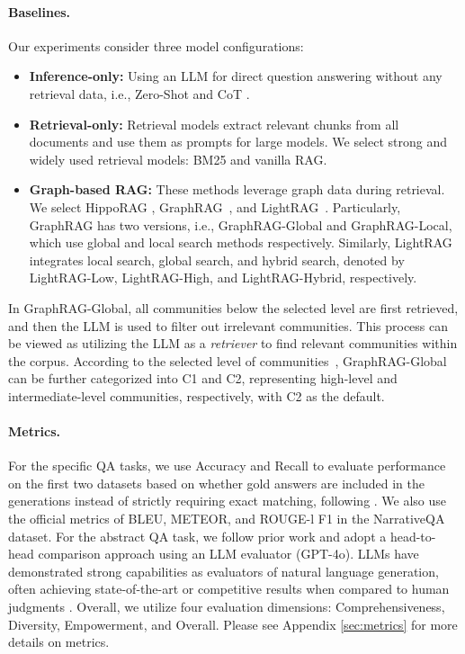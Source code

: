 \paragraph{Baselines.}
Our experiments consider three model configurations:
\begin{itemize}[left=0pt]
\item \textbf{Inference-only:} Using an LLM for direct question answering without any retrieval data, i.e., {Zero-Shot} and {CoT} \cite{kojima2022large}.

\item \textbf{Retrieval-only:} Retrieval models extract relevant chunks from all documents and use them as prompts for large models. We select strong and widely used retrieval models: {BM25} \cite{robertson1994some} and {vanilla RAG}.

\item \textbf{Graph-based RAG:} These methods leverage graph data during retrieval. We select {HippoRAG} \cite{gutierrez2024hipporag}, {GraphRAG}~\cite{edge2024local}, and {LightRAG}~\cite{guo2024lightrag}.
Particularly, {GraphRAG} has two versions, i.e., {GraphRAG-Global} and {GraphRAG-Local}, which use global and local search methods respectively.
Similarly, {LightRAG} integrates local search, global search, and hybrid search, denoted by {LightRAG-Low}, {LightRAG-High}, and {LightRAG-Hybrid}, respectively.
\end{itemize}

In {GraphRAG-Global}, all communities below the selected level are first retrieved, and then the LLM is used to filter out irrelevant communities.
% 
This process can be viewed as utilizing the LLM as a {\it retriever} to find relevant communities within the corpus.
% 
According to the selected level of communities~\cite{edge2024local}, {GraphRAG-Global} can be further categorized into {C1} and {C2}, representing high-level and intermediate-level communities, respectively, with {C2} as the default.
% 

\paragraph{Metrics.}
For the specific QA tasks, we use Accuracy and Recall to evaluate performance on the first two datasets based on whether gold answers are included in the generations instead of strictly requiring exact matching, following \cite{schick2024toolformer,mallen2022not,asai2023self}.
% 
We also use the official metrics of BLEU, METEOR, and ROUGE-l F1 in the NarrativeQA dataset.
% 
For the abstract QA task, we follow prior work \cite{edge2024local} and adopt a head-to-head comparison approach using an LLM evaluator (GPT-4o).
% 
LLMs have demonstrated strong capabilities as evaluators of natural language generation, often achieving state-of-the-art or competitive results when compared to human judgments \cite{wang2023chatgpt, zheng2023judging}. 
% 
Overall, we utilize four evaluation dimensions: Comprehensiveness, Diversity, Empowerment, and Overall.
% 
Please see Appendix \ref{sec:metrics} for more details on metrics.

